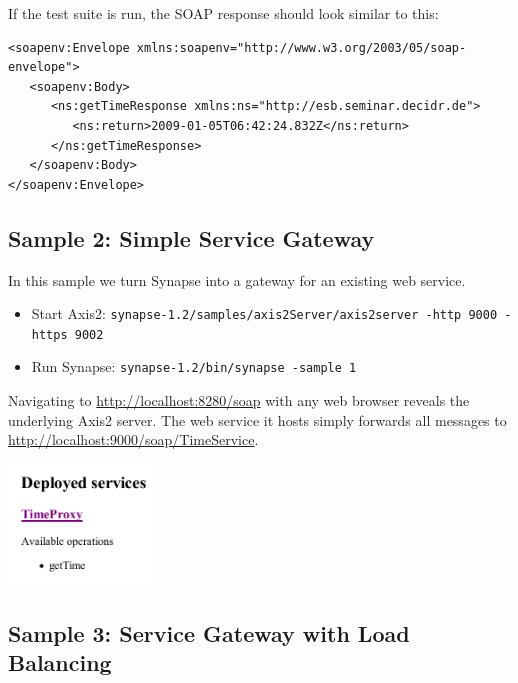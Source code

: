 If the test suite is run, the SOAP response should look similar to this: 

\lstset{caption=, label=sample-1-result-xml}
\begin{lstlisting}
<soapenv:Envelope xmlns:soapenv="http://www.w3.org/2003/05/soap-envelope">
   <soapenv:Body>
      <ns:getTimeResponse xmlns:ns="http://esb.seminar.decidr.de">
         <ns:return>2009-01-05T06:42:24.832Z</ns:return>
      </ns:getTimeResponse>
   </soapenv:Body>
</soapenv:Envelope>
\end{lstlisting}

\newpage
\subsection{Sample 2: Simple Service Gateway}
\label{sec:sample-2}

In this sample we turn Synapse into a gateway for an existing web service.

\begin{itemize}
  \item Start Axis2: \texttt{synapse-1.2/samples/axis2Server/axis2server -http
  9000 -https 9002}
  \item Run Synapse: \texttt{synapse-1.2/bin/synapse -sample 1}
\end{itemize}

\lstset{caption=, label=sample-2-xml}


Navigating to \url{http://localhost:8280/soap} with any web browser reveals the
underlying Axis2 server. The web service it hosts simply forwards all messages
 to \url{http://localhost:9000/soap/TimeService}.

\begin{center}
\includegraphics[width=4cm]{figures/timeproxy-success.pdf}
\end{center}

\newpage
\subsection{Sample 3: Service Gateway with Load Balancing}
\label{sec:sample-3}

